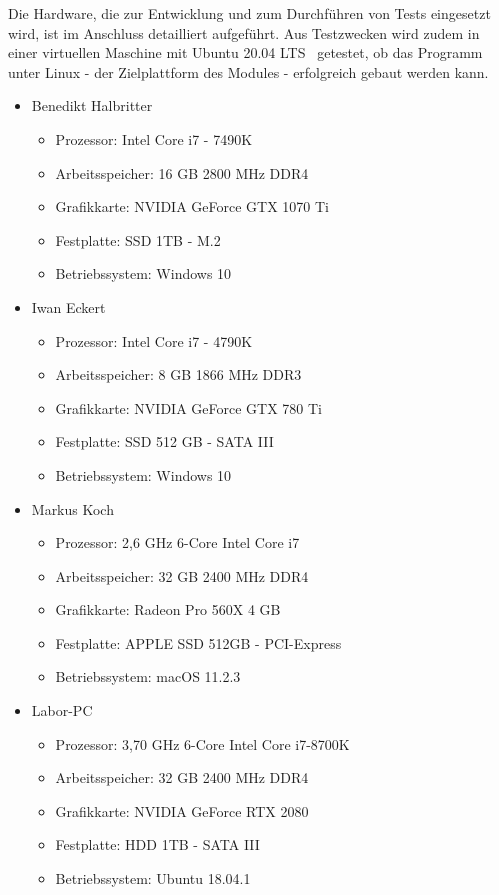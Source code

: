 Die Hardware, die zur Entwicklung und zum Durchf\"uhren von Tests eingesetzt wird, ist im Anschluss detailliert aufgef\"uhrt.
Aus Testzwecken wird zudem in einer virtuellen Maschine mit Ubuntu 20.04 LTS~\cite{ubuntu} getestet, ob das Programm unter Linux - der Zielplattform des Modules - erfolgreich gebaut werden kann.

\newpage

\begin{itemize}
    \item Benedikt Halbritter
    \begin{itemize}
        \item Prozessor: Intel Core i7 - 7490K
        \item Arbeitsspeicher: 16 GB 2800 MHz DDR4
        \item Grafikkarte: NVIDIA GeForce GTX 1070 Ti
        \item Festplatte: SSD 1TB - M.2
        \item Betriebssystem: Windows 10
    \end{itemize}
    \item Iwan Eckert
    \begin{itemize}
        \item Prozessor: Intel Core i7 - 4790K
        \item Arbeitsspeicher: 8 GB 1866 MHz DDR3
        \item Grafikkarte: NVIDIA GeForce GTX 780 Ti
        \item Festplatte: SSD 512 GB - SATA III
        \item Betriebssystem: Windows 10
    \end{itemize}
    \item Markus Koch
    \begin{itemize}
        \item Prozessor: 2,6 GHz 6-Core Intel Core i7
        \item Arbeitsspeicher: 32 GB 2400 MHz DDR4
        \item Grafikkarte: Radeon Pro 560X 4 GB
        \item Festplatte: APPLE SSD 512GB - PCI-Express
        \item Betriebssystem: macOS 11.2.3
    \end{itemize}
    \item Labor-PC
    \begin{itemize}
        \item Prozessor: 3,70 GHz 6-Core Intel Core i7-8700K
        \item Arbeitsspeicher: 32 GB 2400 MHz DDR4
        \item Grafikkarte: NVIDIA GeForce RTX 2080
        \item Festplatte: HDD 1TB - SATA III
        \item Betriebssystem: Ubuntu 18.04.1
    \end{itemize}
\end{itemize}
\vspace{1em}

